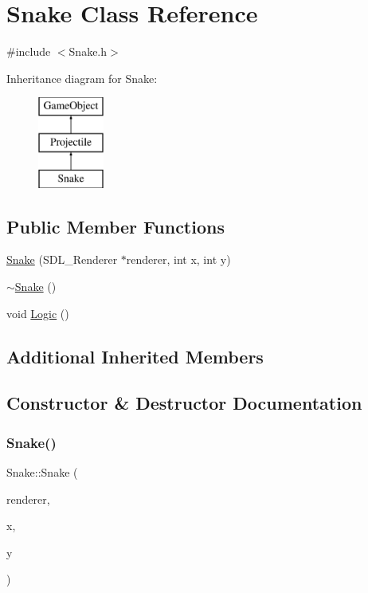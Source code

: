 \hypertarget{class_snake}{}\section{Snake Class Reference}
\label{class_snake}


{\ttfamily \#include $<$Snake.\+h$>$}

Inheritance diagram for Snake\+:\begin{figure}[H]
\begin{center}
\leavevmode
\includegraphics[height=3.000000cm]{class_snake}
\end{center}
\end{figure}
\subsection*{Public Member Functions}
\begin{DoxyCompactItemize}
\item 
\mbox{\hyperlink{class_snake_ae54c34f487c04c54bd7daadbe42d3a4b}{Snake}} (S\+D\+L\+\_\+\+Renderer $\ast$renderer, int x, int y)
\item 
\mbox{\hyperlink{class_snake_a941fbaad96ee33ca3a7c30c28ca44ef8}{$\sim$\+Snake}} ()
\item 
void \mbox{\hyperlink{class_snake_a1f01e21a73734f9c0d701ec02a9d2e41}{Logic}} ()
\end{DoxyCompactItemize}
\subsection*{Additional Inherited Members}


\subsection{Constructor \& Destructor Documentation}
\mbox{\label{class_snake_ae54c34f487c04c54bd7daadbe42d3a4b}} 
\subsubsection{\texorpdfstring{Snake()}{Snake()}}
{\footnotesize\ttfamily Snake\+::\+Snake (\begin{DoxyParamCaption}\item[{S\+D\+L\+\_\+\+Renderer $\ast$}]{renderer,  }\item[{int}]{x,  }\item[{int}]{y }\end{DoxyParamCaption})}

